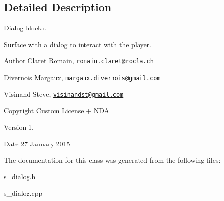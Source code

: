 \subsection{Detailed Description}
Dialog blocks. 

\hyperlink{class_surface}{Surface} with a dialog to interact with the player. \begin{DoxyAuthor}{Author}
Claret Romain, \href{mailto:romain.claret@rocla.ch}{\tt romain.\+claret@rocla.\+ch} 

Divernois Margaux, \href{mailto:margaux.divernois@gmail.com}{\tt margaux.\+divernois@gmail.\+com} 

Visinand Steve, \href{mailto:visinandst@gmail.com}{\tt visinandst@gmail.\+com} 
\end{DoxyAuthor}
\begin{DoxyCopyright}{Copyright}
Custom License + N\+D\+A 
\end{DoxyCopyright}
\begin{DoxyVersion}{Version}
1. 
\end{DoxyVersion}
\begin{DoxyDate}{Date}
27 January 2015 
\end{DoxyDate}


The documentation for this class was generated from the following files\+:\begin{DoxyCompactItemize}
\item 
s\+\_\+dialog.\+h\item 
s\+\_\+dialog.\+cpp\end{DoxyCompactItemize}

